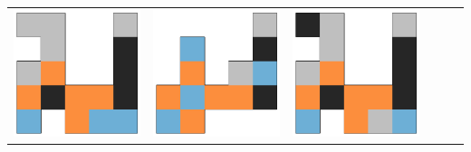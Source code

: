 \begin{tabular}{cccccc}
    \includegraphics[scale=0.1]{images/top_designs/carrier/ga/exp2/gen29_ind3} &
    \includegraphics[scale=0.1]{images/top_designs/carrier/ga/exp2/gen29_ind4} &
    \includegraphics[scale=0.1]{images/top_designs/carrier/ga/exp2/gen29_ind5} \\

\end{tabular}
